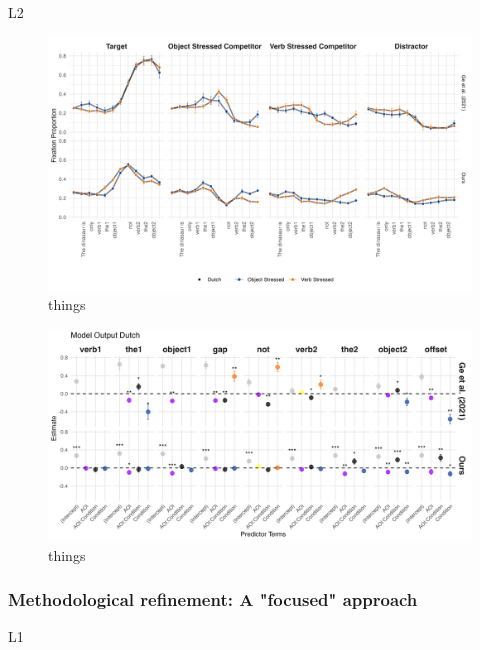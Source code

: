 L2

\begin{figure}[p]  %
    \centering
    \includegraphics[width=\textwidth,height=\textheight,keepaspectratio]{viz/dutch_fix.png}
    \caption{things}
    \label{fig:dutch_fix}
\end{figure}


\begin{figure}[p]  %
    \centering
    \includegraphics[width=\textwidth,height=\textheight,keepaspectratio]{viz/model_plot_dutch.png}
    \caption{things}
    \label{fig:model_plot_dutch}
\end{figure}


\subsubsection{Methodological refinement: A "focused" approach}



L1 

